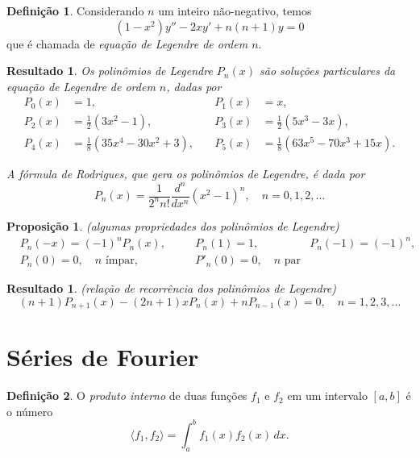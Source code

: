 \documentclass[12pt]{article}
\theoremstyle{plain}
\newtheorem{prop}[thm]{Proposição}
\newtheorem{res}[thm]{Resultado}
\theoremstyle{definition}
\newtheorem{defn}{Definição}[section]
\theoremstyle{remark}
\begin{document}
\begin{defn}
    Considerando \(n\) um inteiro não-negativo, temos 
    \begin{equation}
        (1-x^2)y'' - 2xy' + n(n+1)y = 0
    \end{equation}
    \noindent que é chamada de \emph{equação de Legendre de ordem \(n\)}.
\end{defn}

\begin{res}
    Os polinômios de Legendre \(P_n(x)\) são soluções particulares da equação de Legendre de ordem \(n\), dadas por
    \begin{align*}
        P_0(x) &= 1, & \quad P_1(x) &= x,\\
        P_2(x) &= \frac{1}{2}(3x^2 - 1), & \quad P_3(x) &= \frac{1}{2}(5x^3 - 3x),\\
        P_4(x) &= \frac{1}{8}(35x^4 - 30x^2 + 3), & \quad P_5(x) &= \frac{1}{8}(63x^5 - 70x^3 + 15x). 
    \end{align*}

    \noindent A fórmula de Rodrigues, que gera os polinômios de Legendre, é dada por
    \begin{equation}
        P_n(x) = \frac{1}{2^n n!} \frac{d^n}{dx^n} (x^2 - 1)^n, \quad n=0,1,2,\ldots
    \end{equation}
\end{res}

\begin{prop} (algumas propriedades dos polinômios de Legendre)
    \begin{align*}
        &P_n(-x) = (-1)^n P_n(x), &\quad & P_n(1) = 1, \quad & P_n(-1) = (-1)^n, \\
        &P_n(0) = 0, \quad n \text{ ímpar}, &\quad & P'_n(0) = 0, \quad n \text{ par} &
    \end{align*}
\end{prop}

\begin{res} (relação de recorrência dos polinômios de Legendre)
    \begin{equation}
        (n+1)P_{n+1}(x) - (2n+1)xP_n(x) + nP_{n-1}(x) = 0, \quad n=1,2,3,\ldots
    \end{equation}
\end{res}

\section{Séries de Fourier}

\begin{defn} 
    O \emph{produto interno} de duas funções \(f_1\) e \(f_2\) em um intervalo \([a,b]\) é o número
    \begin{equation}
        \langle f_1, f_2 \rangle = \int_a^b f_1(x)f_2(x) \, dx.
    \end{equation}
\end{defn}
\end{document}
